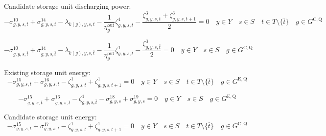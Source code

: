 \documentclass{article}
\newcommand{\sStorageExisting}{G^{\mathrm{E,Q}}}
\newcommand{\sStorageCandidate}{G^{\mathrm{C,Q}}}
\newcommand{\sYears}{Y}
\newcommand{\sScenarios}{S}
\newcommand{\sIntervals}{T}
\newcommand{\iGenerator}{g}
\newcommand{\iYear}{y}
\newcommand{\iScenario}{s}
\newcommand{\iInterval}{t}
\newcommand{\iIntervalTerminal}{\overline{\iInterval}}
\newcommand{\iZone}{z}
\newcommand{\cStorageUnitEfficiencyDischarging}{\eta_{\iGenerator}^{\mathrm{out}}}
\newcommand{\dNonNegativeDischarging}[1][\iGenerator,\iYear,\iScenario,\iInterval]{\sigma_{#1}^{10}}
\newcommand{\dMaxDischargingRateCandidate}[1][\iGenerator,\iYear,\iScenario,\iInterval]{\sigma_{#1}^{14}}
\newcommand{\dNonNegativeStorageEnergy}[1][\iGenerator,\iYear,\iScenario,\iInterval]{\sigma_{#1}^{15}}
\newcommand{\dMaxStorageEnergyExisting}[1][\iGenerator,\iYear,\iScenario,\iInterval]{\sigma_{#1}^{16}}
\newcommand{\dMaxStorageEnergyCandidate}[1][\iGenerator,\iYear,\iScenario,\iInterval]{\sigma_{#1}^{17}}
\newcommand{\dMinStorageEnergyIntervalEnd}[1][\iGenerator,\iYear,\iScenario]{\sigma_{#1}^{18}}
\newcommand{\dMaxStorageEnergyIntervalEnd}[1][\iGenerator,\iYear,\iScenario]{\sigma_{#1}^{19}}
\newcommand{\dPowerBalance}[1][\iZone,\iYear,\iScenario,\iInterval]{\lambda_{#1}}
\newcommand{\dStorageEnergyTransition}[1][\iGenerator,\iYear,\iScenario,\iInterval]{\zeta_{#1}^{1}}
\newcommand{\dStorageEnergyOutput}[1][\iGenerator,\iYear,\iScenario,\iInterval]{\zeta_{#1}^{3}}
\begin{document}
Candidate storage unit discharging power:
\begin{equation}
- \dNonNegativeDischarging + \dMaxDischargingRateCandidate - \dPowerBalance[k(\iGenerator),\iYear,\iScenario,\iInterval] - \frac{1}{\cStorageUnitEfficiencyDischarging} \dStorageEnergyTransition - \frac{\dStorageEnergyOutput + \dStorageEnergyOutput[\iGenerator,\iYear,\iScenario,\iInterval+1]}{2} = 0 \quad \iYear \in \sYears \quad \iScenario \in \sScenarios \quad \iInterval \in \sIntervals \setminus \{\iIntervalTerminal\} \quad \iGenerator \in \sStorageCandidate
\end{equation}

\begin{equation}
- \dNonNegativeDischarging[\iGenerator,\iYear,\iScenario,\iIntervalTerminal] + \dMaxDischargingRateCandidate[\iGenerator,\iYear,\iScenario,\iIntervalTerminal] - \dPowerBalance[k(\iGenerator),\iYear,\iScenario,\iIntervalTerminal] - \frac{1}{\cStorageUnitEfficiencyDischarging} \dStorageEnergyTransition[\iGenerator,\iYear,\iScenario,\iIntervalTerminal] - \frac{\dStorageEnergyOutput[\iGenerator,\iYear,\iScenario,\iIntervalTerminal]}{2} = 0 \quad \iYear \in \sYears \quad \iScenario \in \sScenarios \quad \iGenerator \in \sStorageCandidate
\end{equation}

Existing storage unit energy:
\begin{equation}
- \dNonNegativeStorageEnergy + \dMaxStorageEnergyExisting - \dStorageEnergyTransition + \dStorageEnergyTransition[\iGenerator,\iYear,\iScenario,\iInterval+1] = 0 \quad \iYear \in \sYears \quad \iScenario \in \sScenarios \quad \iInterval \in \sIntervals \setminus \{\iIntervalTerminal\} \quad \iGenerator \in \sStorageExisting
\end{equation}

\begin{equation}
- \dNonNegativeStorageEnergy[\iGenerator,\iYear,\iScenario,\iIntervalTerminal] + \dMaxStorageEnergyExisting[\iGenerator,\iYear,\iScenario,\iIntervalTerminal] - \dStorageEnergyTransition[\iGenerator,\iYear,\iScenario,\iIntervalTerminal] - \dMinStorageEnergyIntervalEnd + \dMaxStorageEnergyIntervalEnd = 0 \quad \iYear \in \sYears \quad \iScenario \in \sScenarios \quad \iGenerator \in \sStorageExisting
\end{equation}

Candidate storage unit energy:
\begin{equation}
- \dNonNegativeStorageEnergy + \dMaxStorageEnergyCandidate - \dStorageEnergyTransition + \dStorageEnergyTransition[\iGenerator,\iYear,\iScenario,\iInterval+1] = 0 \quad \iYear \in \sYears \quad \iScenario \in \sScenarios \quad \iInterval \in \sIntervals \setminus \{\iIntervalTerminal\} \quad \iGenerator \in \sStorageCandidate
\end{equation}
\end{document}
